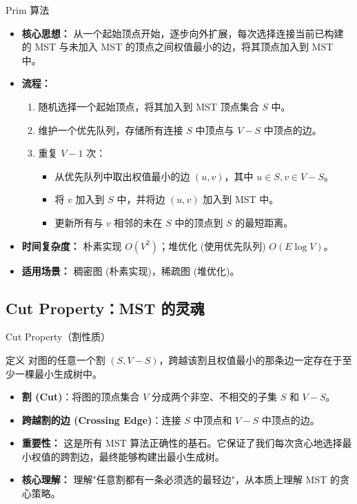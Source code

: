 \documentclass[11pt]{beamer}
\begin{document}
\begin{frame}{Prim 算法}
    \begin{itemize}
        \item \textbf{核心思想：} 从一个起始顶点开始，逐步向外扩展，每次选择连接当前已构建的 MST 与未加入 MST 的顶点之间权值最小的边，将其顶点加入到 MST 中。
        \item \textbf{流程：}
        \begin{enumerate}
            \item 随机选择一个起始顶点，将其加入到 MST 顶点集合 $S$ 中。
            \item 维护一个优先队列，存储所有连接 $S$ 中顶点与 $V-S$ 中顶点的边。
            \item 重复 $V-1$ 次：
            \begin{itemize}
                \item 从优先队列中取出权值最小的边 $(u, v)$，其中 $u \in S, v \in V-S$。
                \item 将 $v$ 加入到 $S$ 中，并将边 $(u, v)$ 加入到 MST 中。
                \item 更新所有与 $v$ 相邻的未在 $S$ 中的顶点到 $S$ 的最短距离。
            \end{itemize}
        \end{enumerate}
        \item \textbf{时间复杂度：} 朴素实现 $O(V^2)$；堆优化 (使用优先队列) $O(E \log V)$。
        \item \textbf{适用场景：} 稠密图 (朴素实现)，稀疏图 (堆优化)。
    \end{itemize}
\end{frame}

\subsection{Cut Property：MST 的灵魂}
\begin{frame}{Cut Property（割性质）}
    \begin{block}{定义}
        对图的任意一个割 $(S, V-S)$，跨越该割且权值最小的那条边一定存在于至少一棵最小生成树中。
    \end{block}
    \begin{itemize}
        \item \textbf{割 (Cut)}：将图的顶点集合 $V$ 分成两个非空、不相交的子集 $S$ 和 $V-S$。
        \item \textbf{跨越割的边 (Crossing Edge)}：连接 $S$ 中顶点和 $V-S$ 中顶点的边。
        \item \textbf{重要性：} 这是所有 MST 算法正确性的基石。它保证了我们每次贪心地选择最小权值的跨割边，最终能够构建出最小生成树。
        \item \textbf{核心理解：} 理解"任意割都有一条必须选的最轻边"，从本质上理解 MST 的贪心策略。
    \end{itemize}
\end{frame}
\end{document}
